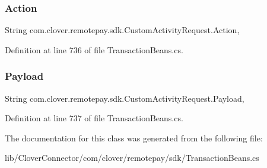 \subsubsection{\texorpdfstring{Action}{Action}}
{\footnotesize\ttfamily String com.\+clover.\+remotepay.\+sdk.\+Custom\+Activity\+Request.\+Action\hspace{0.3cm}{\ttfamily [get]}, {\ttfamily [set]}}



Definition at line 736 of file Transaction\+Beans.\+cs.

\mbox{\label{classcom_1_1clover_1_1remotepay_1_1sdk_1_1_custom_activity_request_a90da946f0584992aff1b82e6012877b4}} 
\subsubsection{\texorpdfstring{Payload}{Payload}}
{\footnotesize\ttfamily String com.\+clover.\+remotepay.\+sdk.\+Custom\+Activity\+Request.\+Payload\hspace{0.3cm}{\ttfamily [get]}, {\ttfamily [set]}}



Definition at line 737 of file Transaction\+Beans.\+cs.



The documentation for this class was generated from the following file\+:\begin{DoxyCompactItemize}
\item 
lib/\+Clover\+Connector/com/clover/remotepay/sdk/Transaction\+Beans.\+cs\end{DoxyCompactItemize}
